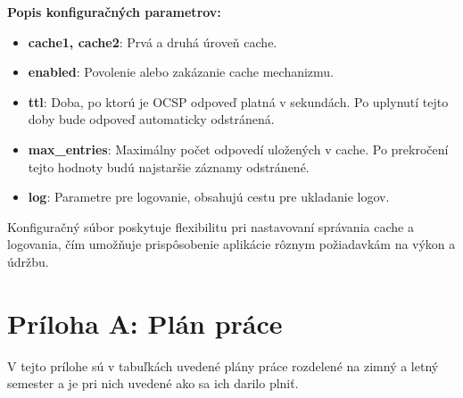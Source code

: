 \documentclass[12pt, twoside]{book}
\begin{document}
\textbf{Popis konfiguračných parametrov:}
\begin{itemize}
\item \textbf{cache1, cache2}: Prvá a druhá úroveň cache.

\item \textbf{enabled}: Povolenie alebo zakázanie cache mechanizmu.

\item \textbf{ttl}: Doba, po ktorú je OCSP odpoveď platná v sekundách. Po uplynutí tejto doby bude odpoveď automaticky odstránená.

\item \textbf{max\_entries}: Maximálny počet odpovedí uložených v cache. Po prekročení tejto hodnoty budú najstaršie záznamy odstránené.

\item \textbf{log}: Parametre pre logovanie, obsahujú cestu pre ukladanie logov.
\end{itemize}

Konfiguračný súbor poskytuje flexibilitu pri nastavovaní správania cache a logovania, čím umožňuje prispôsobenie aplikácie rôznym požiadavkám na výkon a údržbu. 



\newpage\null\thispagestyle{empty}\newpage

\makeatletter
{}
\makeatother

{}


 



\newpage\null\thispagestyle{empty}\newpage
\newpage
\pagestyle{fancy}
\setcounter{page}{1}
\renewcommand{\thepage}{A-\arabic{page}}
\fancyhf{}
\fancyfoot[C]{\thepage} 
\thispagestyle{plain}
\makeatletter
{}  %
\makeatother
{}
{}

\section*{Príloha A: Plán práce} 
V tejto prílohe sú v tabuľkách uvedené plány práce rozdelené na zimný a letný semester a je pri nich uvedené ako sa ich darilo plniť.
\end{document}
